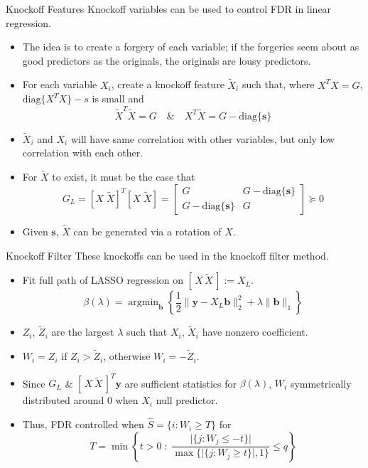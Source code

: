 \documentclass{beamer}
\newcommand{\diag}[1]{\mathrm{diag}\{#1\}}
\DeclareMathOperator*{\argmin}{arg\min}
\begin{document}
\begin{frame}{Knockoff Features}
    Knockoff variables can be used to control FDR in linear regression. 
    \begin{itemize}
        \item The idea is to create a forgery of each variable; if the forgeries seem about as good predictors as the originals, the originals are lousy predictors.
        \item For each variable $X_i$, create a knockoff feature $\tilde X_i$ such that, where $X^TX=G$, $\diag{X^T X} - s$ is small and 
            \[ \tilde X^T \tilde X = G \quad \& \quad X^T \tilde X = G - \diag{\mathbf s} \]
        \item $\tilde X_i$ and $X_i$ will have same correlation with other variables, but only low correlation with each other.
        \item For $\tilde X$ to exist, it must be the case that
            \[ G_L =[X\; \tilde X]^T[X\; \tilde X] = \left[ \begin{array}{cc} G & G - \diag{\mathbf s} \\ G - \diag{\mathbf s} & G \end{array}\right] \succeq 0 \]
        \item Given $\mathbf s$, $\tilde X$ can be generated via a rotation of $X$.
    \end{itemize}
\end{frame}

\begin{frame}{Knockoff Filter}
    These knockoffs can be used in the knockoff filter method. 
    \begin{itemize}
        \item Fit full path of LASSO regression on $[\,X\,\tilde X\,]:=X_L$.
            \[ \beta(\lambda) = \argmin_\mathbf b \left\{\frac{1}{2}\|\mathbf y - X_L\mathbf b\|^2_2 + \lambda\|\mathbf{b}\|_1 \right\}\]
        \item $Z_i$, $\tilde Z_i$ are the largest $\lambda$ such that $X_i$, $\tilde X_i$ have nonzero coefficient.
        \item $W_i= Z_i$ if $Z_i>\tilde Z_i$, otherwise $W_i = -\tilde Z_i$.
        \item Since $G_L$ \& $[\, X \, \tilde X\,]^T\mathbf y$ are sufficient statistics for $\beta(\lambda)$, $W_i$ symmetrically distributed around $0$ when $X_i$ null predictor.
        \item Thus, FDR controlled when $\hat S = \{i:W_i\geq T\}$ for 
            \[ T = \min\left\{ t>0 \;: \; \frac{\vert\{j:W_j\leq -t\}\vert}{\max\{\vert\{j:W_j\geq t\}\vert,1\}}\leq q \right\} \]
    \end{itemize}
\end{frame}
\end{document}
